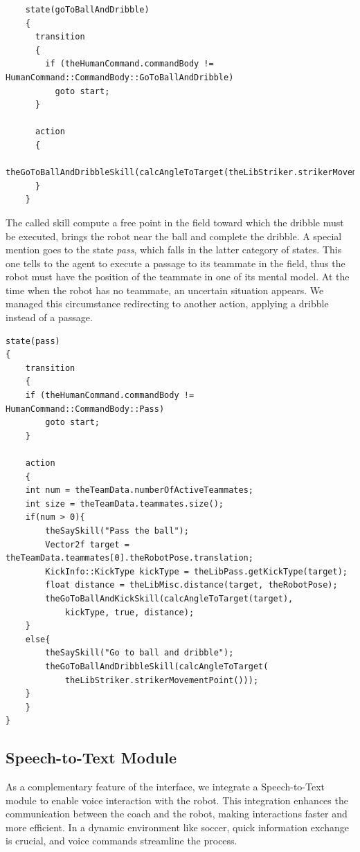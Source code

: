 \documentclass[a4paper, onecolumn, 12pt]{article}
\begin{document}
\begin{verbatim}
    state(goToBallAndDribble)
    {
      transition
      {
        if (theHumanCommand.commandBody != HumanCommand::CommandBody::GoToBallAndDribble)
          goto start;
      }

      action
      {
        theGoToBallAndDribbleSkill(calcAngleToTarget(theLibStriker.strikerMovementPoint()));
      }
    }
\end{verbatim}
The called skill compute a free point in the field toward which the dribble must be executed,  
brings the robot near the ball and complete the dribble.
A special mention goes to the state \textit{pass}, which falls in the latter category of states.
This one tells to the agent to execute a passage to its teammate in the field, thus the robot
must have the position of the teammate in one of its mental model. 
At the time when the robot has no teammate, an uncertain situation appears.
We managed this circumstance redirecting to another action, applying a dribble instead of a passage.

\begin{verbatim}
state(pass)
{
    transition
    {
    if (theHumanCommand.commandBody != HumanCommand::CommandBody::Pass)
        goto start;
    }

    action
    {
    int num = theTeamData.numberOfActiveTeammates;
    int size = theTeamData.teammates.size();
    if(num > 0){
        theSaySkill("Pass the ball");
        Vector2f target = theTeamData.teammates[0].theRobotPose.translation;
        KickInfo::KickType kickType = theLibPass.getKickType(target);
        float distance = theLibMisc.distance(target, theRobotPose);
        theGoToBallAndKickSkill(calcAngleToTarget(target), 
            kickType, true, distance);
    }
    else{
        theSaySkill("Go to ball and dribble");
        theGoToBallAndDribbleSkill(calcAngleToTarget(
            theLibStriker.strikerMovementPoint()));
    }
    }
}
\end{verbatim}



\subsection{Speech-to-Text Module}
As a complementary feature of the interface, we integrate a Speech-to-Text module to enable voice 
interaction with the robot. This integration enhances the communication between the coach and the robot, 
making interactions faster and more efficient. In a dynamic environment like soccer, quick information 
exchange is crucial, and voice commands streamline the process.
\end{document}
